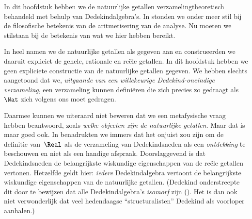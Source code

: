 \documentclass[openany]{memoir}
\begin{document}


In dit hoofdstuk hebben we de natuurlijke getallen
verzamelingtheoretisch behandeld met behulp van Dedekindalgebra's. In
 stonden we onder meer stil bij de filosofische
betekenis van de aritmetisering van de analyse. Nu moeten we stilstaan
bij de betekenis van wat we hier hebben bereikt.

In heel  namen we de natuurlijke getallen als
gegeven aan en construeerden we daaruit expliciet de gehele, rationale
en reële getallen. In dit hoofdstuk hebben we geen expliciete
constructie van de natuurlijke getallen gegeven. We hebben slechts
aangetoond dat we, \emph{uitgaande van een willekeurige
Dedekind-oneindige verzameling}, een verzameling kunnen definiëren die zich precies zo
gedraagt als~$\Nat$ zich volgens ons moet gedragen.

Daarmee kunnen we uiteraard niet beweren dat we een metafysische vraag
hebben beantwoord, zoals \emph{welke objecten zijn de natuurlijke
getallen}. Maar dat is maar goed ook. In
 benadrukten we immers dat het onjuist zou
zijn om de definitie van~$\Real$ als de verzameling van Dedekindsneden
als een \emph{ontdekking} te beschouwen en niet als een handige afspraak.
Doorslaggevend is dat Dedekindsneden de belangrijkste wiskundige
eigenschappen van de reële getallen vertonen. Hetzelfde geldt hier:
\emph{iedere} Dedekindalgebra vertoont de belangrijkste wiskundige
eigenschappen van de natuurlijke getallen. (Dedekind onderstreepte dit
door te bewijzen dat alle Dedekindalgebra's \emph{isomorf} zijn
(\citeyear[stellingen 132--3]{Dedekind1888}). Het is dan ook niet
verwonderlijk dat veel hedendaagse ``structuralisten'' Dedekind als
voorloper aanhalen.)
\end{document}
